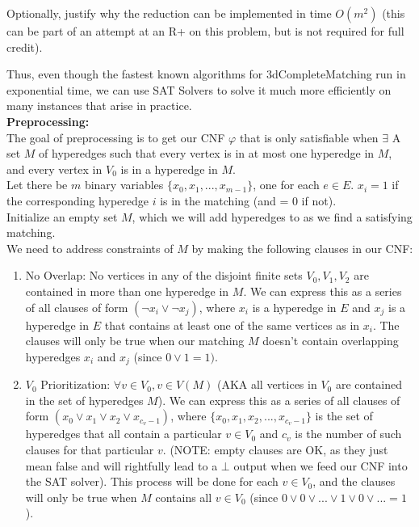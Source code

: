 \documentclass[11pt]{article}
\begin{document}
\begin{enumerate}
\begin{enumerate}
Optionally, justify why the reduction can be implemented in time $O(m^2)$ (this can be part of an attempt at an R+ on this problem, but is not required for full credit).

Thus, even though the fastest known algorithms for 3dCompleteMatching run in exponential time, we can use SAT Solvers to solve it much more efficiently on many instances that arise in practice. \\

\textbf{Preprocessing: } \\

The goal of preprocessing is to get our CNF $\varphi$ that is only satisfiable when $\exists$ A set $M$ of hyperedges such that every vertex is in at most one hyperedge in $M$, and every vertex in $V_0$ is in a hyperedge in $M$. \\

Let there be $m$ binary variables $\{x_0,x_1,...,x_{m-1}\}$, one for each $e \in E$. $x_i = 1$ if the corresponding hyperedge $i$ is in the matching (and = 0 if not). \\

Initialize an empty set $M$, which we will add hyperedges to as we find a satisfying matching. \\

We need to address constraints of $M$ by making the following clauses in our CNF: \\

\begin{enumerate}
    \item No Overlap: No vertices in any of the disjoint finite sets $V_0,V_1,V_2$ are contained in more than one hyperedge in $M$. We can express this as a series of all clauses of form $(\neg x_i \vee \neg x_j)$, where $x_i$ is a hyperedge in $E$ and $x_j$ is a hyperedge in $E$ that contains at least one of the same vertices as in $x_i$. The clauses will only be true when our matching $M$ doesn't contain overlapping hyperedges $x_i$ and $x_j$ (since $0 \vee 1 = 1)$. \\
    \item $V_0$ Prioritization: $\forall v \in V_0, v \in V(M)$ (AKA all vertices in $V_0$ are contained in the set of hyperedges $M$). We can express this as a series of all clauses of form $(x_0 \vee x_1 \vee x_2 \vee x_{c_{v}-1})$, where $\{x_0, x_1, x_2, ..., x_{c_{v}-1}\}$ is the set of hyperedges that all contain a particular $v \in V_0$ and $c_v$ is the number of such clauses for that particular $v$. (NOTE: empty clauses are OK, as they just mean false and will rightfully lead to a $\bot$ output when we feed our CNF into the SAT solver). This process will be done for each $v \in V_0$, and the clauses will only be true when $M$ contains all $v \in V_0$ (since $0 \vee 0 \vee ... \vee 1 \vee 0 \vee ...  = 1$). \\
\end{enumerate}


\end{enumerate}
\end{enumerate}
\end{document}
